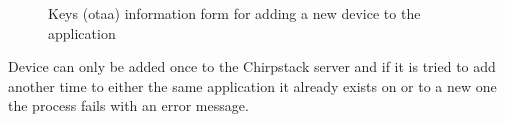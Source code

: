 \begin{figure}[ht]
  \centering
  \caption{Keys (\gls{otaa}) information form for adding a new device to the application}
  \label{fig:chirpstack_new_device_2}
\end{figure}

Device can only be added once to the Chirpstack server and if it is tried to add another time to either the same application it already exists on or to a new one the process fails with an error message.


\clearpage %
